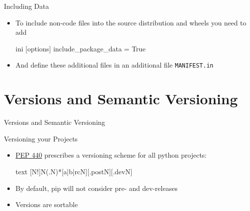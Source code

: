 \documentclass[
  aspectratio=1610,
]{beamer}
\newcommand\headlineframe[1]{%
  \begin{frame}[c]%
    \begin{center}%
      \Huge\color{vertexDarkRed}#1%
    \end{center}%
  \end{frame}%
}%
\begin{document}
\begin{frame}[c,fragile]{Including Data}
  \begin{itemize}
    \item To include non-code files into the source distribution and wheels you need to add
      \begin{code}[title={setup.cfg}]{ini}
      [options]
      include_package_data = True
      \end{code}
    \item And define these additional files in an additional file \texttt{MANIFEST.in}
  \end{itemize}
\end{frame}


\section{Versions and Semantic Versioning}
\headlineframe{Versions and Semantic Versioning}
\begin{frame}[fragile, c]{Versioning your Projects}
  \begin{itemize}
    \item \href{https://www.python.org/dev/peps/pep-0440}{PEP 440} prescribes a versioning scheme for all python projects:
      \begin{code}{text}
      [N!]N(.N)*[{a|b|rc}N][.postN][.devN]
      \end{code}
    \item By default, pip will not consider pre- and dev-releases
    \item Versions are sortable
  \end{itemize}
\end{frame}
\end{document}

